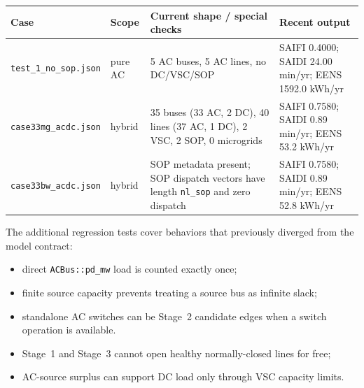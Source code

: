 \begin{center}
\begin{tabular}{llll}
\hline
Case & Scope & Current shape / special checks & Recent output \\
\hline
\texttt{test\_1\_no\_sop.json} & pure AC & 5 AC buses, 5 AC lines, no DC/VSC/SOP &
SAIFI 0.4000; SAIDI 24.00 min/yr; EENS 1592.0 kWh/yr \\
\texttt{case33mg\_acdc.json} & hybrid &
35 buses (33 AC, 2 DC), 40 lines (37 AC, 1 DC), 2 VSC, 2 SOP, 0 microgrids &
SAIFI 0.7580; SAIDI 0.89 min/yr; EENS 53.2 kWh/yr \\
\texttt{case33bw\_acdc.json} & hybrid &
SOP metadata present; SOP dispatch vectors have length \texttt{nl\_sop} and zero dispatch &
SAIFI 0.7580; SAIDI 0.89 min/yr; EENS 52.8 kWh/yr \\
\hline
\end{tabular}
\end{center}

The additional regression tests cover behaviors that previously diverged from
the model contract:
\begin{itemize}
  \item direct \texttt{ACBus::pd\_mw} load is counted exactly once;
  \item finite source capacity prevents treating a source bus as infinite slack;
  \item standalone AC switches can be Stage~2 candidate edges when a switch
        operation is available.
  \item Stage~1 and Stage~3 cannot open healthy normally-closed lines for free;
  \item AC-source surplus can support DC load only through VSC capacity limits.
\end{itemize}


